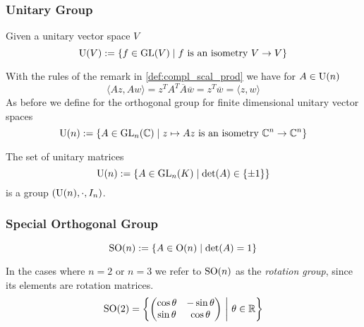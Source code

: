 \subsubsection{Unitary Group}
\begin{proposition}
   Given a unitary vector space \(V\)
   \[\operatorname{U}(V) := \{f \in \operatorname{GL}(V) \mid f~\text{is an isometry}~V \to V\}\]
\end{proposition}
With the rules of the remark in \cref{def:compl_scal_prod} we have for \(A \in \operatorname{U}(n)\)
\[\langle Az, Aw\rangle = z^TA^T\overline{A}\overline{w} = z^T \overline{w} = \langle z, w\rangle\]
As before we define for the orthogonal group for finite dimensional unitary vector spaces
\[\operatorname{U}(n) := \{A \in \operatorname{GL}_n(\mathbb{C}) \mid z \mapsto Az~\text{is an isometry}~\mathbb{C}^n \to \mathbb{C}^n\}\]
\begin{proposition}
   The set of unitary matrices
   \[\operatorname{U}(n) := \{A \in \operatorname{GL}_n(K) \mid \det(A) \in \{\pm 1\}\}\]
   is a group \((\operatorname{U}(n), \cdot, I_n)\).
\end{proposition}

\subsubsection{Special Orthogonal Group}
\begin{proposition}
   \[\operatorname{SO}(n) := \{A \in \operatorname{O}(n) \mid \det(A) = 1\}\]
\end{proposition}
\begin{remark}[Terminology]
   In the cases where \(n = 2\) or \(n = 3\) we refer to \(\operatorname{SO}(n)\) as the \emph{rotation group}, since its elements are rotation matrices.
   \[\operatorname{SO}(2) = \left\{\begin{pmatrix}\cos\theta & -\sin\theta\\ \sin\theta & \cos\theta\end{pmatrix} ~\middle|~ \theta \in \mathbb{R}\right\}\]
\end{remark}

